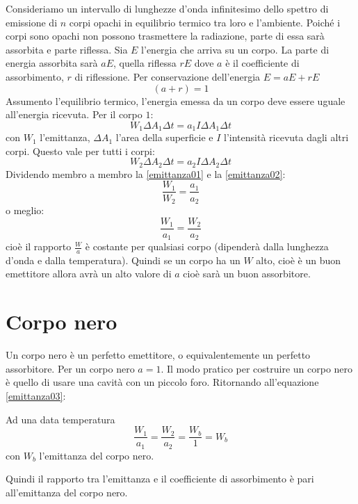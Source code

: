 Consideriamo un intervallo di lunghezze d'onda infinitesimo dello spettro di emissione di $n$ corpi opachi in equilibrio termico tra loro e l'ambiente. Poiché i corpi sono opachi non possono trasmettere la radiazione, parte di essa sarà assorbita e parte riflessa. Sia $E$ l'energia che arriva su un corpo. La parte di energia assorbita sarà $aE$, quella riflessa $rE$ dove $a$ è il coefficiente di assorbimento, $r$ di riflessione. Per conservazione dell'energia $E=aE+rE$
\begin{equation}
	(a+r)=1
\end{equation}
Assumento l'equilibrio termico, l'energia emessa da un corpo deve essere uguale all'energia ricevuta. Per il corpo $1$:
\begin{equation}
	W_1\Delta A_1\Delta t=a_1I\Delta A_1\Delta t
	\label{emittanza01}
\end{equation}
con $W_1$ l'emittanza, $\Delta A_1$ l'area della superficie e $I$ l'intensità ricevuta dagli altri corpi. Questo vale per tutti i corpi:
\begin{equation}
	W_2\Delta A_2\Delta t=a_2I\Delta A_2\Delta t
	\label{emittanza02}
\end{equation}
Dividendo membro a membro la \eqref{emittanza01} e la \eqref{emittanza02}:
\begin{equation*}
	\frac{W_1}{W_2}=\frac{a_1}{a_2}
\end{equation*}
o meglio:
\begin{equation}
	\frac{W_1}{a_1}=\frac{W_2}{a_2}
	\label{emittanza03}
\end{equation}
cioè il rapporto $\frac{W}{a}$ è costante per qualsiasi corpo (dipenderà dalla lunghezza d'onda e dalla temperatura). Quindi se un corpo ha un $W$ alto, cioè è un buon emettitore allora avrà un alto valore di $a$ cioè sarà un buon assorbitore.
\section{Corpo nero}
Un corpo nero è un perfetto emettitore, o equivalentemente un perfetto assorbitore. Per un corpo nero $a=1$. Il modo pratico per costruire un corpo nero è quello di usare una cavità con un piccolo foro. Ritornando all'equazione \eqref{emittanza03}:
\begin{legge}
	Ad una data temperatura
	\begin{equation}
		\frac{W_1}{a_1}=\frac{W_2}{a_2}=\frac{W_b}{1}=W_b
	\end{equation}
	con $W_b$ l'emittanza del corpo nero.
\end{legge}
Quindi il rapporto tra l'emittanza e il coefficiente di assorbimento è pari all'emittanza del corpo nero.
